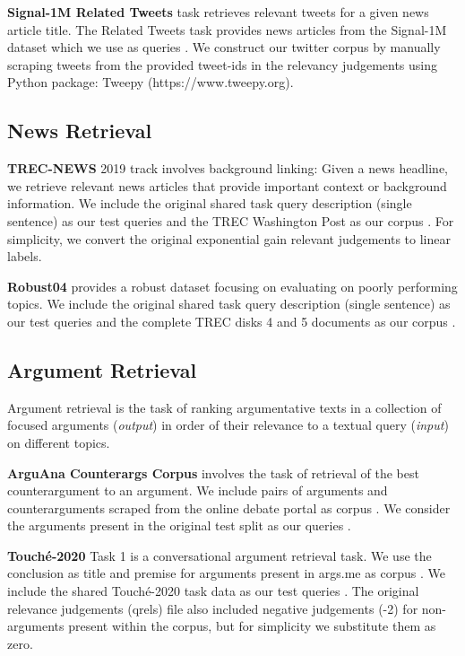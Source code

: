 \documentclass{article}
\begin{document}
\textbf{Signal-1M Related Tweets} \cite{Signal1MRelatedTweetsRetrieval2018} task retrieves relevant tweets for a given news article title. The Related Tweets task provides news articles from the Signal-1M dataset \cite{Signal1M2016} which we use as queries . We construct our twitter corpus  by manually scraping tweets from the provided tweet-ids in the relevancy judgements using Python package: Tweepy (https://www.tweepy.org).

\vspace{-2mm}
\subsection{News Retrieval}
\vspace{-1mm}

\textbf{TREC-NEWS} \cite{soboroff2019trec} 2019 track involves background linking: Given a news headline, we retrieve relevant news articles that provide important context or background information. We include the original shared task query description (single sentence) as our test queries  and the TREC Washington Post as our corpus . For simplicity, we convert the original exponential gain relevant judgements to linear labels. 

\textbf{Robust04} \cite{96071} provides a robust dataset focusing on evaluating on poorly performing topics. We include the original shared task query description (single sentence) as our test queries  and the complete TREC disks 4 and 5 documents as our corpus .

\vspace{-2mm}
\subsection{Argument Retrieval}
\vspace{-1mm}
Argument retrieval is the task of ranking argumentative texts in a collection of focused arguments (\textit{output}) in order of their relevance to a textual query (\textit{input}) on different topics.

\textbf{ArguAna Counterargs Corpus} \cite{wachsmuth:2018a} involves the task of retrieval of the best counterargument to an argument. We include pairs of arguments and counterarguments scraped from the online debate portal as corpus . We consider the arguments present in the original test split as our queries .

\textbf{Touch\'e-2020} \cite{stein:2020v} Task 1 is a conversational argument retrieval task. We use the conclusion as title and premise for arguments present in args.me \cite{stein:2017r} as corpus . We include the shared Touch\'e-2020 task data as our test queries . The original relevance judgements (qrels) file also included negative judgements (-2) for non-arguments present within the corpus, but for simplicity we substitute them as zero.  
\end{document}
